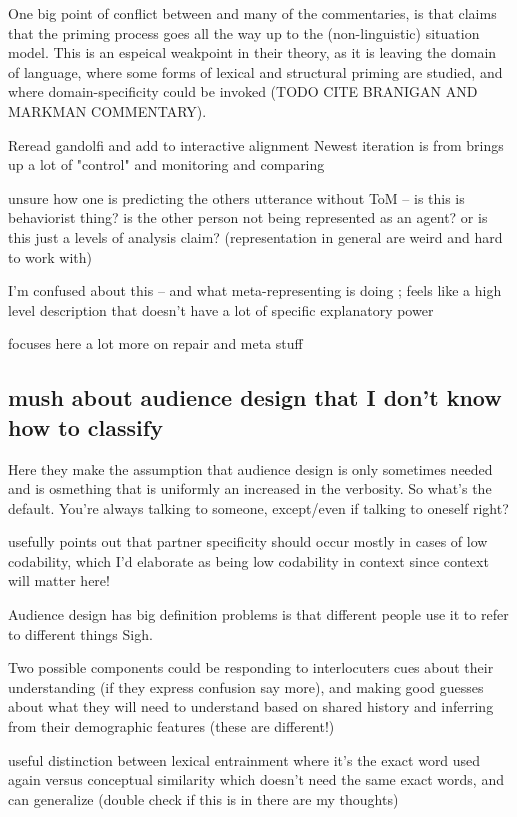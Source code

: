 \documentclass[]{article}
\begin{document}
One big point of conflict between \cite{pickering2004} and many of the commentaries, is that \cite{pickering2004} claims that the priming process goes all the way up to the (non-linguistic) situation model. This is an espeical weakpoint in their theory, as it is leaving the domain of language, where some forms of lexical and structural priming are studied, and where domain-specificity could be invoked (TODO CITE BRANIGAN AND MARKMAN COMMENTARY). 

Reread gandolfi and add to interactive alignment
Newest iteration is from \cite{gandolfi2022} brings up a lot of "control" and monitoring and comparing 

unsure how one is predicting the others utterance without ToM -- is this is behaviorist thing? is the other person not being represented as an agent? or is this just a levels of analysis claim? (representation in general are weird and hard to work with)

I'm confused about this -- and what meta-representing is doing ; feels like a high level description that doesn't have a lot of specific explanatory power

focuses here a lot more on repair and meta stuff 


\subsection{mush about audience design that I don't know how to classify}

\cite{horton2002a} Here they make the assumption that audience design is only sometimes needed and is osmething that is uniformly an increased in the verbosity. So what's the default. You're always talking to someone, except/even if talking to oneself right? 

\cite{horton2002a} usefully points out that partner specificity should occur mostly in cases of low codability, which I'd elaborate as being low codability in context since context will matter here!

Audience design has big definition problems is that different people use it to refer to different things Sigh. 

Two possible components could be  responding to interlocuters cues about their understanding (if they express confusion say more), and making good guesses about what they will need to understand based on shared history and inferring from their demographic features (these are different!) 

\cite{horton2002a} useful distinction between lexical entrainment where it's the exact word used again versus conceptual similarity which doesn't need the same exact words, and can generalize (double check if this is in there are my thoughts) 
\end{document}
